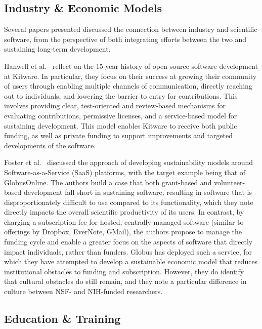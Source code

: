 \documentclass[11pt, oneside]{amsart}
\newcommand{\toolname}[1] {\textsf{#1}}
\begin{document}
\subsection{Industry \& Economic Models}

Several papers presented discussed the connection between industry and
scientific software, from the perspective of both integrating efforts
between the two and sustaining long-term development.

Hanwell et al.~\cite{Hanwell_WSSSPE} reflect on the 15-year history of
open source software development at \toolname{Kitware}.  In
particular, they focus on their success at growing their community of
users through enabling multiple channels of communication, directly
reaching out to individuals, and lowering the barrier to entry for
contributions. This involves providing clear, test-oriented and
review-based mechanisms for evaluating contributions, permissive
licenses, and a service-based model for sustaining development.  This
model enables \toolname{Kitware} to receive both public funding, as
well as private funding to support improvements and targeted
developments of the software.

Foster et al.~\cite{Foster_WSSSPE} discussed the approach of
developing sustainability models around Software-as-a-Service (SaaS)
platforms, with the target example being that of
\toolname{GlobusOnline}.  The authors build a case that both
grant-based and volunteer-based development fall short in sustaining
software, resulting in software that is disproportionately difficult
to use compared to its functionality, which they note directly impacts
the overall scientific productivity of its users.  In contrast, by
charging a subscription fee for hosted, centrally-managed software
(similar to offerings by \toolname{Dropbox}, \toolname{EverNote},
\toolname{GMail}), the authors propose to manage the funding cycle and
enable a greater focus on the aspects of software that directly impact
individuals, rather than funders.  \toolname{Globus} has deployed such
a service, for which they have attempted to develop a sustainable
economic model that reduces institutional obstacles to funding and
subscription.  However, they do identify that cultural obstacles do
still remain, and they note a particular difference in culture between
NSF- and NIH-funded researchers.


\subsection{Education \& Training}
\end{document}

